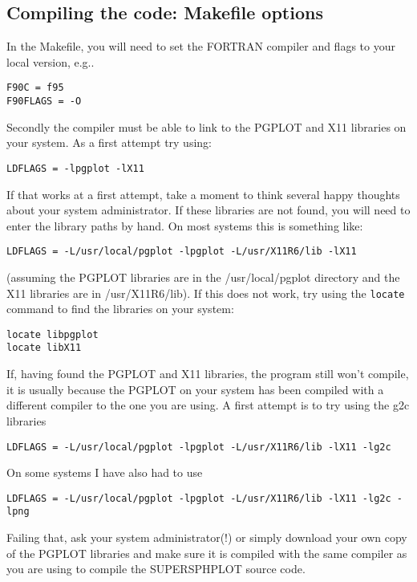 \documentclass[a4paper,12pt]{article}
\begin{document}
\subsection{Compiling the code: Makefile options}
 In the Makefile, you will need to set the FORTRAN compiler and flags to your local version, e.g..
\begin{verbatim}
F90C = f95
F90FLAGS = -O
\end{verbatim}
 Secondly the compiler must be able to link to the PGPLOT and X11 libraries on
your system. As a first attempt try using:
\begin{verbatim}
LDFLAGS = -lpgplot -lX11
\end{verbatim}
If that works at a first attempt, take a moment to think several happy thoughts about your system
administrator. If these libraries are not found, you will need to enter the
library paths by hand. On most systems this is something like:
\begin{verbatim}
LDFLAGS = -L/usr/local/pgplot -lpgplot -L/usr/X11R6/lib -lX11
\end{verbatim}
(assuming the PGPLOT libraries are in the /usr/local/pgplot directory and the
X11 libraries are in /usr/X11R6/lib). If this does not work, try using the
\verb+locate+ command to find the libraries on your system:
\begin{verbatim}
locate libpgplot
locate libX11
\end{verbatim}
 If, having found the PGPLOT and X11
libraries, the program still won't compile, it is usually
because the PGPLOT on your system has been compiled with a different compiler to
the one you are using. A first attempt is to try using the g2c libraries
\begin{verbatim}
LDFLAGS = -L/usr/local/pgplot -lpgplot -L/usr/X11R6/lib -lX11 -lg2c
\end{verbatim}
On some systems I have also had to use
\begin{verbatim}
LDFLAGS = -L/usr/local/pgplot -lpgplot -L/usr/X11R6/lib -lX11 -lg2c -lpng
\end{verbatim}
Failing that, ask your system administrator(!) or simply download your own copy of
the PGPLOT libraries and make sure it is compiled with the same compiler as you
are using to compile the SUPERSPHPLOT source code.
\end{document}
